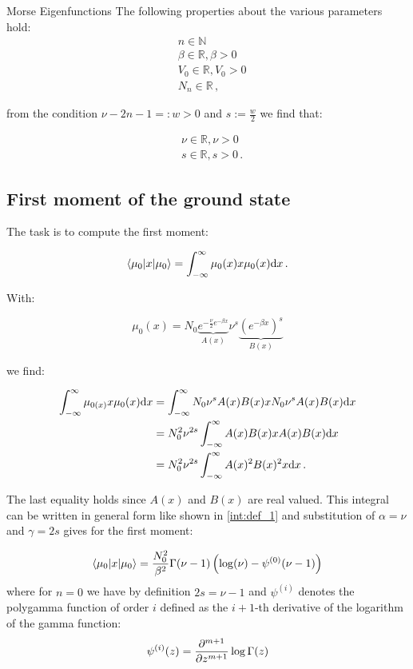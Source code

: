 \begin{chapter}{Morse Eigenfunctions}
The following properties about the various parameters hold:
\begin{align}
  & n \in \mathbb{N} \\
  & \beta \in \mathbb{R}, \beta > 0 \\
  & V_{0} \in \mathbb{R}, V_{0} > 0 \\
  & N_{n} \in \mathbb{R} \,,
\end{align}

from the condition $\nu - 2n - 1 =: w > 0$ and $s := \frac{w}{2}$ we find that:

\begin{align}
  & \nu \in \mathbb{R}, \nu > 0 \\
  & s \in \mathbb{R}, s > 0 \,.
\end{align}

\subsection{First moment of the ground state}

The task is to compute the first moment:

\begin{equation}
  \left\langle \mu_{0} | x | \mu_{0} \right\rangle = \int_{-\infty}^{\infty} \mu_{0}(x) x \mu_{0}(x) \mathrm{d}x \,.
\end{equation}

With:

\begin{equation}
  \mu_{0}(x) = N_{0} \underbrace{e^{-\frac{\nu}{2} e^{-\beta x}}}_{A(x)} \nu^{s} \underbrace{\left(e^{-\beta x}\right)^{s}}_{B(x)}
\end{equation}

we find:

\begin{align}
    \int_{-\infty}^{\infty} \mu_{0(x)} x \mu_{0}(x) \mathrm{d}x
  & =   \int_{-\infty}^{\infty} N_{0} \nu^{s} A(x) B(x) x N_{0} \nu^{s} A(x) B(x) \mathrm{d}x \\
  & =   N_{0}^{2} \nu^{2s} \int_{-\infty}^{\infty} A(x) B(x) x A(x) B(x) \mathrm{d}x \\
  & =   N_{0}^{2} \nu^{2s} \int_{-\infty}^{\infty} A(x)^{2} B(x)^{2} x \mathrm{d}x \,.
\end{align}

The last equality holds since $A(x)$ and $B(x)$ are real valued.
This integral can be written in general form like shown in \eqref{int:def_1}
and substitution of $\alpha=\nu$ and $\gamma=2s$ gives for the first moment:

\begin{equation}
    \left\langle \mu_{0} | x | \mu_{0} \right\rangle
    = \frac{N_{0}^{2}}{\beta^{2}} \Gamma(\nu-1) \left(\log(\nu) - \psi^{(0)}(\nu-1)\right)
\end{equation}
where for $n=0$ we have by definition $2s = \nu - 1$ and $\psi^{(i)}$ denotes the polygamma function of
order $i$ defined as the $i+1$-th derivative of the logarithm of the gamma function:
\begin{align}
\psi^{(i)}(z)=\frac{\partial ^{m+1}}{\partial z^{m+1}}\log \Gamma(z)
\end{align}




\end{chapter}
